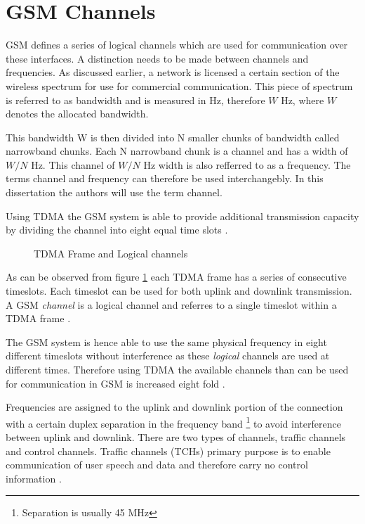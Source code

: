 \section{GSM Channels}
\label{sec:interfacech}
GSM defines a series of logical channels which are used for communication over these interfaces. A distinction needs to be made between channels and frequencies. As discussed earlier, a network is licensed a certain section of the wireless spectrum for use for commercial communication. This piece of spectrum is referred to as bandwidth and is measured in Hz, therefore $W$ Hz, where $W$ denotes the allocated bandwidth\cite{FundamentalsWirelessCommunication}.

This bandwidth W is then divided into N smaller chunks of bandwidth called narrowband chunks. Each N narrowband chunk is a channel and has a width of $W/N$ Hz\cite{FundamentalsWirelessCommunication}. This channel of $W/N$ Hz width is also refferred to as a frequency.
The terms channel and frequency can therefore be used interchangebly. In this dissertation the authors will use the term channel.

Using TDMA the GSM system is able to provide additional transmission capacity by dividing the channel into eight equal time slots \cite{wirelesstelcoMullet}. 
\begin{figure}[h]
	\begin{centering}
		
		\caption{TDMA Frame and Logical channels \cite{wirelesstelcoMullet}}
		\label{fig:GSMChannels}
	\end{centering}
\end{figure}
As can be observed from figure \ref{fig:GSMChannels} each TDMA frame has a series of consecutive timeslots. Each timeslot can be used for both uplink and downlink transmission. A GSM \emph{channel} is a logical channel and referres to a single timeslot within a TDMA frame \cite{wirelesstelcoMullet,GSMArchitectureProtocolsServices}.

The GSM system is hence able to use the same physical frequency in eight different timeslots without interference as these \emph{logical} channels are used at different times. Therefore using TDMA the available channels than can be used for communication in GSM is increased eight fold \cite{wirelesstelcoMullet}.

Frequencies are assigned to the uplink and downlink portion of the connection with a certain duplex separation in the frequency band \footnote{Separation is usually 45 MHz} to avoid interference between uplink and downlink. There are two types of channels, traffic channels and control channels. Traffic channels (TCHs) primary purpose is to enable communication of user speech and data and therefore carry no control information \cite{GSMArchitectureProtocolsServices}.

